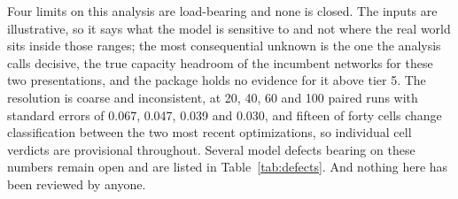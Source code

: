 Four limits on this analysis are load-bearing and none is closed. The inputs are illustrative, so
it says what the model is sensitive to and not where the real world sits inside those ranges; the
most consequential unknown is the one the analysis calls decisive, the true capacity headroom of
the incumbent networks for these two presentations, and the package holds no evidence for it above
tier 5. The resolution is coarse and inconsistent, at 20, 40, 60 and 100 paired runs with standard
errors of 0.067, 0.047, 0.039 and 0.030, and fifteen of forty cells change classification between
the two most recent optimizations, so individual cell verdicts are provisional throughout. Several
model defects bearing on these numbers remain open and are listed in Table~\ref{tab:defects}. And
nothing here has been reviewed by anyone.

